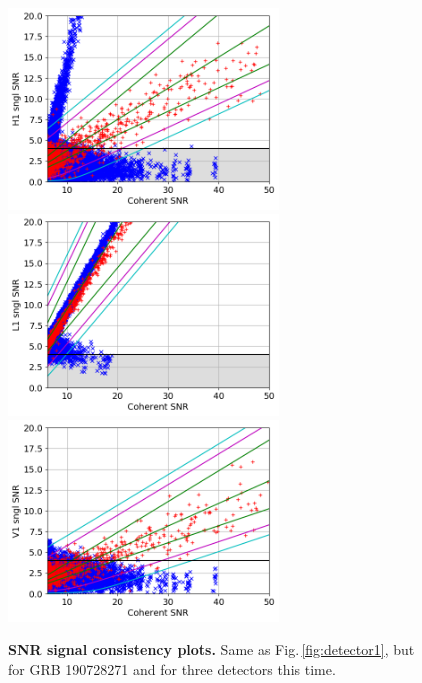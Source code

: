 \documentclass[binding=0.6cm, LaM]{sapthesis}
\begin{document}
        \begin{figure}[!t]
          \noindent
          \label{detector2_final}
          \centering
            \includegraphics[width=0.64\textwidth]{GRB190728271_H1_snr_vs_snr_zoom}\\
            \includegraphics[width=0.64\textwidth]{GRB190728271_L1_snr_vs_snr_zoom}\\
            \includegraphics[width=0.64\textwidth]{GRB190728271_V1_snr_vs_snr_zoom}%
          \caption{{\bf SNR signal consistency plots.} Same as Fig.\,\ref{fig:detector1}, but for GRB 190728271 and for three detectors this time.}
          \label{fig:detector2_final}
        \end{figure}
\end{document}
